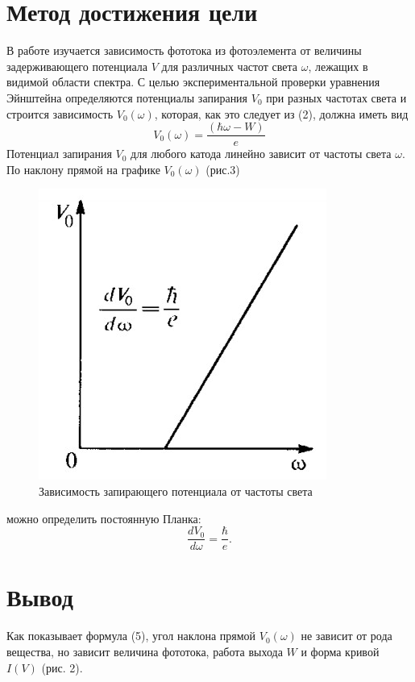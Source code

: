 \documentclass[a4paper,12pt]{article}
\begin{document}
\section{Метод достижения цели}
    В работе изучается зависимость фототока из фотоэлемента от величины
    задерживающего потенциала $V$ для различных частот света $\omega$, лежащих в
    видимой области спектра. С целью экспериментальной проверки уравнения Эйнштейна
    определяются потенциалы запирания $V_0$ при разных частотах света и строится
    зависимость $V_0(\omega)$, которая, как это следует из (2), должна иметь вид
    \begin{equation}
        V_0(\omega)=\frac{(\hbar\omega-W)}{e}
    \end{equation}
    Потенциал запирания $V_0$ для любого катода линейно зависит от частоты света
    $\omega$. По наклону прямой на графике $V_0(\omega)$ (рис.3)
    \begin{figure}[h!]
        \begin{center}
            \includegraphics[width=0.4\linewidth]{2020-12-09-3.jpg}
            \caption{Зависимость запирающего потенциала от частоты света}
        \end{center}
    \end{figure}
    \pagebreak

    можно определить постоянную Планка:
    \begin{equation}
        \frac{dV_0}{d\omega}=\frac{\hbar}{e}.
    \end{equation}
\section{Вывод}
    Как показывает формула (5), угол наклона прямой $V_0(\omega)$ не зависит от рода
    вещества, но зависит величина фототока, работа выхода $W$ и форма кривой $I(V)$ (рис. 2).
\end{document}
